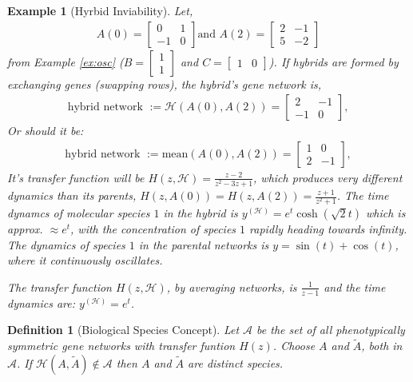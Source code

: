\documentclass[11 pt]{article}
\newcommand{\jss}[1]{{\color{olive}\it #1}}
\newtheorem{definition}{Definition}
\newtheorem{example}{Example}
\begin{document}
\begin{example}[Hyrbid Inviability]
  Let, \begin{align*}
    A(0) =\left[\begin{matrix}
      0 & 1 \\
      -1 & 0
    \end{matrix}\right]
    \text{and }
    A(2) = \left[\begin{matrix}
      2 & -1 \\
      5 & -2
    \end{matrix}\right]
  \end{align*}
  from Example \ref{ex:osc} ($B=\begin{bmatrix} 1 \\ 1 \end{bmatrix}$ and $C=\begin{bmatrix} 1 & 0 \end{bmatrix}$). 
If hybrids are formed by exchanging genes (swapping rows), the hybrid's gene network is,
  \begin{align*}
    \text{hybrid network } := \mathcal{H}(A(0), A(2)) = \left[\begin{matrix}
      2 & -1 \\
      -1 & 0
    \end{matrix}\right] ,
  \end{align*}
  \jss{ Or should it be: \begin{align*}
    \text{hybrid network } := \text{mean}(A(0), A(2)) = \left[\begin{matrix}
      1 & 0 \\
      2 & -1
    \end{matrix}\right] ,
  \end{align*} }
  It's transfer function will be $H(z, \mathcal{H}) = \frac{z-2}{z^2 - 3z +1}$, which produces very different dynamics than its parents, $H(z, A(0)) = H(z, A(2)) = \frac{z+1}{z^2 + 1}$. The time dynamcs of molecular species $1$ in the hybrid is $y^{(\mathcal{H})} =e^{t} \cosh(\sqrt{2} t)$ \jss{ which is approx. $\approx e^{t}$}, with the concentration of species $1$ rapidly heading towards infinity. The dynamics of species $1$ in the parental networks is $y = \sin(t) + \cos(t)$, where it continuously oscillates.

  \jss{The transfer function $H(z, \mathcal{H})$, by averaging networks, is $\frac{1}{z-1}$ and the time dynamics are: $y^{(\mathcal{H})} = e^{t}$.}
\end{example}

\begin{definition}[Biological Species Concept]
  Let $\mathcal{A}$ be the set of all phenotypically symmetric gene networks with transfer funtion $H(z)$. 
  Choose $A$ and $\widetilde A$, both in $\mathcal{A}$. 
  If $\mathcal{H}(A, \widetilde A) \notin \mathcal{A}$ then $A$ and $\widetilde A$ are distinct species. 
\end{definition}
\end{document}
